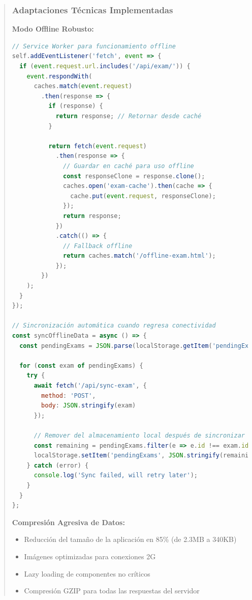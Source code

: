 \documentclass[12pt,a4paper]{report}
\begin{document}
\begin{quote}
\subsubsection{Adaptaciones Técnicas Implementadas}

\textbf{Modo Offline Robusto:}
\begin{lstlisting}[language=JavaScript, caption=Implementación de sincronización offline]
// Service Worker para funcionamiento offline
self.addEventListener('fetch', event => {
  if (event.request.url.includes('/api/exam/')) {
    event.respondWith(
      caches.match(event.request)
        .then(response => {
          if (response) {
            return response; // Retornar desde caché
          }
          
          return fetch(event.request)
            .then(response => {
              // Guardar en caché para uso offline
              const responseClone = response.clone();
              caches.open('exam-cache').then(cache => {
                cache.put(event.request, responseClone);
              });
              return response;
            })
            .catch(() => {
              // Fallback offline
              return caches.match('/offline-exam.html');
            });
        })
    );
  }
});

// Sincronización automática cuando regresa conectividad
const syncOfflineData = async () => {
  const pendingExams = JSON.parse(localStorage.getItem('pendingExams') || '[]');
  
  for (const exam of pendingExams) {
    try {
      await fetch('/api/sync-exam', {
        method: 'POST',
        body: JSON.stringify(exam)
      });
      
      // Remover del almacenamiento local después de sincronizar
      const remaining = pendingExams.filter(e => e.id !== exam.id);
      localStorage.setItem('pendingExams', JSON.stringify(remaining));
    } catch (error) {
      console.log('Sync failed, will retry later');
    }
  }
};
\end{lstlisting}

\textbf{Compresión Agresiva de Datos:}
\begin{itemize}
\item Reducción del tamaño de la aplicación en 85\% (de 2.3MB a 340KB)
\item Imágenes optimizadas para conexiones 2G
\item Lazy loading de componentes no críticos
\item Compresión GZIP para todas las respuestas del servidor
\end{itemize}


\end{quote}
\end{document}
